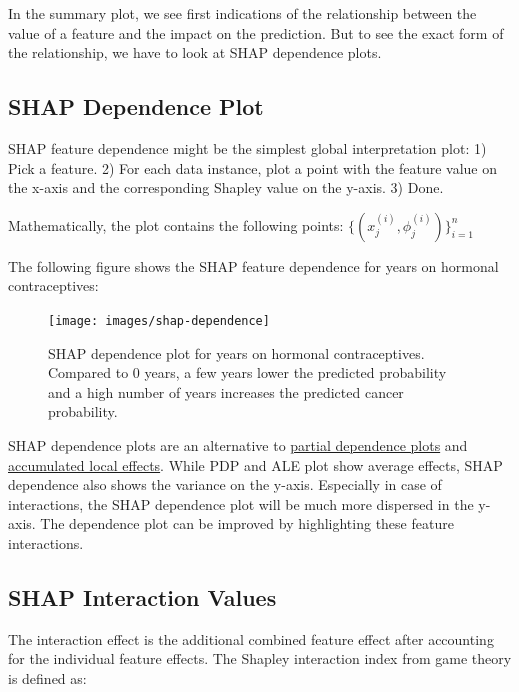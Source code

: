 \documentclass[
  11pt,
]{scrbook}
\begin{document}
In the summary plot, we see first indications of the relationship between the value of a feature and the impact on the prediction.
But to see the exact form of the relationship, we have to look at SHAP dependence plots.

\hypertarget{shap-dependence-plot}{%
\subsection{SHAP Dependence Plot}\label{shap-dependence-plot}}

SHAP feature dependence might be the simplest global interpretation plot:
1) Pick a feature.
2) For each data instance, plot a point with the feature value on the x-axis and the corresponding Shapley value on the y-axis.
3) Done.

Mathematically, the plot contains the following points: \(\{(x_j^{(i)},\phi_j^{(i)})\}_{i=1}^n\)

The following figure shows the SHAP feature dependence for years on hormonal contraceptives:

\begin{figure}

{\centering \texttt{[image: images/shap-dependence]} 

}

\caption{SHAP dependence plot for years on hormonal contraceptives. Compared to 0 years, a few years lower the predicted probability and a high number of years increases the predicted cancer probability.}\label{fig:unnamed-chunk-47}
\end{figure}

SHAP dependence plots are an alternative to \protect\hyperlink{pdp}{partial dependence plots} and \protect\hyperlink{ale}{accumulated local effects}.
While PDP and ALE plot show average effects, SHAP dependence also shows the variance on the y-axis.
Especially in case of interactions, the SHAP dependence plot will be much more dispersed in the y-axis.
The dependence plot can be improved by highlighting these feature interactions.

\hypertarget{shap-interaction-values}{%
\subsection{SHAP Interaction Values}\label{shap-interaction-values}}

The interaction effect is the additional combined feature effect after accounting for the individual feature effects.
The Shapley interaction index from game theory is defined as:
\end{document}
